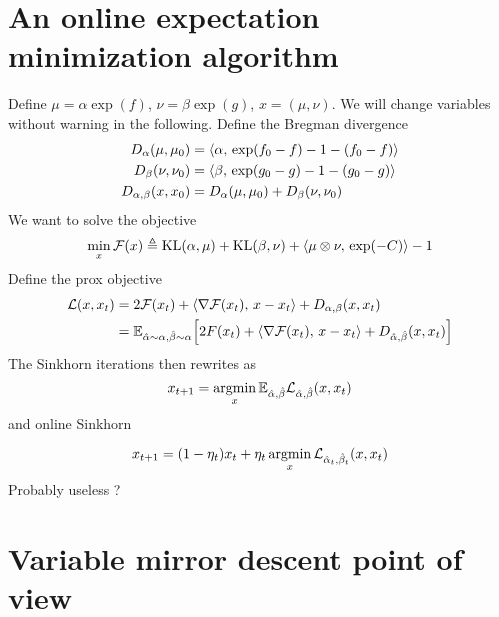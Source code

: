 \documentclass[a4paper, 10pt]{article}
\begin{document}
\section{An online expectation minimization algorithm}

Define $\mu = \alpha \exp(f)$, $\nu = \beta \exp(g)$, $x = (\mu, \nu)$. We will change variables without warning in the following.
Define the Bregman divergence
\begin{align}
    D_{\alpha}(\mu, \mu_0) &= \langle \alpha,\,\exp(f_0 - f) - 1 - (f_0 - f)\rangle \\
    D_{\beta}(\nu, \nu_0) &= \langle \beta,\,\exp(g_0 - g) - 1 - (g_0 - g)\rangle \\
    D_{\alpha, \beta}(x, x_0) &= D_{\alpha}(\mu, \mu_0) + D_{\beta}(\nu, \nu_0)
\end{align}
We want to solve the objective
\begin{equation}
    \min_x \mathcal{F}(x) \triangleq \text{KL}(\alpha, \mu) + \text{KL}(\beta, \nu) + \langle \mu \otimes \nu,\,\exp(-C)\rangle - 1
\end{equation}
Define the prox objective
\begin{align}
    \mathcal{L}(x, x_t) &= 2 \mathcal{F}(x_t) + \langle \nabla \mathcal{F}(x_t),\,x - x_t\rangle + D_{\alpha,\beta}(x, x_t) \\
    &= \mathbb{E}_{\hat \alpha \sim \alpha, \hat \beta \sim \alpha}
    \Big[2 F(x_t) + \langle \nabla \mathcal{F}(x_t),\,x - x_t\rangle + D_{\hat \alpha,\hat \beta}(x, x_t) \Big]
\end{align}
The Sinkhorn iterations then rewrites as
\begin{equation}
    x_{t+1} = \operatorname*{argmin}_x \mathbb{E}_{\hat \alpha, \hat \beta} \mathcal{L}_{\hat \alpha, \hat \beta}(x, x_t)
\end{equation}
and online Sinkhorn

\begin{equation}
    x_{t+1} = (1 - \eta_t) x_t + \eta_t \operatorname*{argmin}_x \mathcal{L}_{\hat \alpha_t, \hat \beta_t}(x, x_t)
\end{equation}
Probably useless ?

\section{Variable mirror descent point of view}
\end{document}
